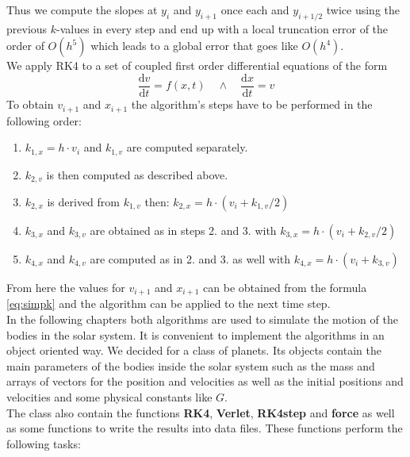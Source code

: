 \documentclass[11pt,a4wide]{article}
\begin{document}
	Thus we compute the slopes at $y_i$ and $y_{i+1}$ once each and $y_{i+1/2}$ twice using the previous $k$-values in every step and end up with a local truncation error of  the order of $O(h^5)$ which leads to a global error that goes like $O(h^4)$.
	\\
	We apply RK4 to a set of coupled first order differential equations of the form
	\begin{equation}
  \dfrac{\mathrm d v}{\mathrm dt}=f(x,t) \quad\wedge\quad \dfrac{\mathrm d x}{\mathrm dt}=v
	\label{eq:New}
	\end{equation}
	To obtain $v_{i+1}$ and $x_{i+1}$ the algorithm's steps have to be performed in the following order:
	\begin{enumerate}
		\item $k_{1,x}=h\cdot v_i$ and $k_{1,v}$ are computed separately.
		\item $k_{2,v}$ is then computed as described above. 
		\item $k_{2,x}$ is derived from $k_{1,v}$ then: $k_{2,x}=h\cdot(v_i+k_{1,v}/2)$
		\item $k_{3,x}$ and $k_{3,v}$ are obtained as in steps 2. and 3. with $k_{3,x}=h\cdot(v_i+k_{2,v}/2)$
		\item $k_{4,x}$ and $k_{4,v}$ are computed as in 2. and 3. as well with $k_{4,x}=h\cdot(v_i+k_{3,v})$
	\end{enumerate}
	From here the values for $v_{i+1}$ and $x_{i+1}$ can be obtained from the formula \ref{eq:simpk} and the algorithm can be applied to the next time step.
	\\
	In the following chapters both algorithms are used to simulate the motion of the bodies in the solar system. It is convenient to implement the algorithms in an object oriented way. We decided for a class of planets. Its objects contain the main parameters of the bodies inside the solar system such as the mass and arrays of vectors for the position and velocities as well as the initial positions and velocities and some physical constants like $G$.
	\\
	The class also contain the functions \textbf{RK4}, \textbf{Verlet}, \textbf{RK4step} and \textbf{force} as well as some functions to write the results into data files. These functions perform the following tasks:
\end{document}
